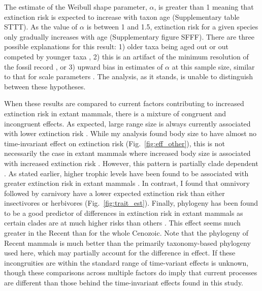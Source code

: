 \documentclass[12pt]{article}
\begin{document}
The estimate of the Weibull shape parameter, $\alpha$, is greater than 1 meaning that extinction risk is expected to increase with taxon age (Supplementary table STTT). As the value of $\alpha$ is between 1 and 1.5, extinction risk for a given species only gradually increases with age (Supplementary figure SFFF). There are three possible explanations for this result: 1) older taxa being aged out or out competed by younger taxa \cite{Wagner2014b}, 2) this is an artifact of the minimum resolution of the fossil record \cite{Sepkoski1975}, or 3) upward bias in estimates of $\alpha$ at this sample size, similar to that for scale parameters \cite{Gelman2013d}. The analysis, as it stands, is unable to distinguish between these hypotheses.


When these results are compared to current factors contributing to increased extinction risk in extant mammals, there is a mixture of congruent and incongruent effects. As expected, large range size is always currently associated with lower extinction risk \cite{Fritz2009,Fritz2010b,Liow2009,Purvis2000a}. While my analysis found body size to have almost no time-invariant effect on extinction risk (Fig.~\ref{fig:eff_other}), this is not necessarily the case in extant mammals where increased body size is associated with increased extinction risk \cite{Liow2009,Purvis2000a}. However, this pattern is partially clade dependent \cite{Fritz2009}. As stated earlier, higher trophic levels have been found to be associated with greater extinction risk in extant mammals \cite{Purvis2000a,Liow2009}. In contrast, I found that omnivory followed by carnivory have a lower expected extinction risk than either insectivores or herbivores (Fig.~\ref{fig:trait_est}). Finally, phylogeny has been found to be a good predictor of differences in extinction risk in extant mammals as certain clades are at much higher risks than others \cite{Fritz2010b}. This effect seems much greater in the Recent than for the whole Cenozoic. Note that the phylogeny of Recent mammals is much better than the primarily taxonomy-based phylogeny used here, which may partially account for the difference in effect. If these incongruities are within the standard range of time-variant effects is unknown, though these comparisons across multiple factors do imply that current processes are different than those behind the time-invariant effects found in this study. 
\end{document}
